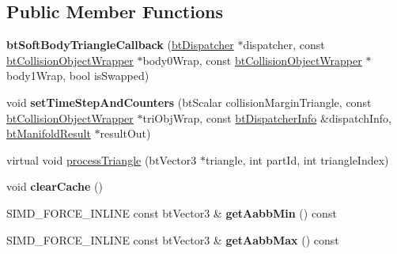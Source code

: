 \subsection*{Public Member Functions}
\begin{DoxyCompactItemize}
\item 
\hypertarget{classbt_soft_body_triangle_callback_a284cfe07d6c1a1ffeabfd7c48576e36f}{{\bfseries bt\+Soft\+Body\+Triangle\+Callback} (\hyperlink{classbt_dispatcher}{bt\+Dispatcher} $\ast$dispatcher, const \hyperlink{structbt_collision_object_wrapper}{bt\+Collision\+Object\+Wrapper} $\ast$body0\+Wrap, const \hyperlink{structbt_collision_object_wrapper}{bt\+Collision\+Object\+Wrapper} $\ast$body1\+Wrap, bool is\+Swapped)}\label{classbt_soft_body_triangle_callback_a284cfe07d6c1a1ffeabfd7c48576e36f}

\item 
\hypertarget{classbt_soft_body_triangle_callback_ae0e0d1ffa14c1233dbcb90b874abdc80}{void {\bfseries set\+Time\+Step\+And\+Counters} (bt\+Scalar collision\+Margin\+Triangle, const \hyperlink{structbt_collision_object_wrapper}{bt\+Collision\+Object\+Wrapper} $\ast$tri\+Obj\+Wrap, const \hyperlink{structbt_dispatcher_info}{bt\+Dispatcher\+Info} \&dispatch\+Info, \hyperlink{classbt_manifold_result}{bt\+Manifold\+Result} $\ast$result\+Out)}\label{classbt_soft_body_triangle_callback_ae0e0d1ffa14c1233dbcb90b874abdc80}

\item 
virtual void \hyperlink{classbt_soft_body_triangle_callback_a0f8b46eba213eb55a451e182d2f6a9be}{process\+Triangle} (bt\+Vector3 $\ast$triangle, int part\+Id, int triangle\+Index)
\item 
\hypertarget{classbt_soft_body_triangle_callback_a75aaa07edcb61f8fbf451fb4c51a3185}{void {\bfseries clear\+Cache} ()}\label{classbt_soft_body_triangle_callback_a75aaa07edcb61f8fbf451fb4c51a3185}

\item 
\hypertarget{classbt_soft_body_triangle_callback_a863b9be5e6fd3313f81df02c1399c6a4}{S\+I\+M\+D\+\_\+\+F\+O\+R\+C\+E\+\_\+\+I\+N\+L\+I\+N\+E const bt\+Vector3 \& {\bfseries get\+Aabb\+Min} () const }\label{classbt_soft_body_triangle_callback_a863b9be5e6fd3313f81df02c1399c6a4}

\item 
\hypertarget{classbt_soft_body_triangle_callback_a3a992c453d96653ba3d954b2daf19085}{S\+I\+M\+D\+\_\+\+F\+O\+R\+C\+E\+\_\+\+I\+N\+L\+I\+N\+E const bt\+Vector3 \& {\bfseries get\+Aabb\+Max} () const }\label{classbt_soft_body_triangle_callback_a3a992c453d96653ba3d954b2daf19085}

\end{DoxyCompactItemize}
